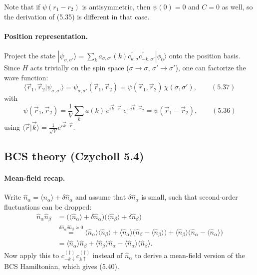 \documentclass[../../main.tex]{subfiles}
\begin{document}
Note that if $\psi(r_1-r_2)$ is antisymmetric, then $\psi(0)=0$ and $C=0$ as well, so the
derivation of (5.35) is different in that case.

\paragraph{Position representation.}
Project the state
$|\psi_{\sigma,\sigma'}\rangle=\sum_k a_{\sigma,\sigma'}(k)c^\dagger_{k,\sigma}
c^\dagger_{-k,\sigma'}|\phi_0\rangle$ onto the position basis. Since $H$ acts trivially
on the spin space ($\sigma\to\sigma$, $\sigma'\to\sigma'$), one can factorize the wave
function:
\begin{equation}
\langle \vec r_1,\vec r_2|\psi_{\sigma,\sigma'}\rangle
=\psi_{\sigma,\sigma'}(\vec r_1,\vec r_2)
=\psi(\vec r_1,\vec r_2)\,\chi(\sigma,\sigma'),
\qquad (5.37)
\end{equation}
with
\begin{equation}
\psi(\vec r_1,\vec r_2)=\frac{1}{V}\sum_k a(k)\,
e^{i\vec k\cdot\vec r_1}e^{-i\vec k\cdot\vec r_2}=\psi(\vec r_1-\vec r_2),
\qquad (5.36)
\end{equation}
using $\langle\vec r|\vec k\rangle=\frac{1}{\sqrt V}e^{i\vec k\cdot\vec r}$.

\subsection{BCS theory (Czycholl 5.4)}
\label{sec:bcs-theory_details}

\paragraph{Mean-field recap.}
Write $\hat n_\alpha=\langle n_\alpha\rangle+\delta\hat n_\alpha$ and assume that
$\delta\hat n_\alpha$ is small, such that second-order fluctuations can be dropped:
\begin{align}
\hat n_\alpha\hat n_\beta
&=\big(\langle\hat n_\alpha\rangle+\delta\hat n_\alpha\big)
  \big(\langle\hat n_\beta\rangle+\delta\hat n_\beta\big)\\
&\overset{\delta\hat n_\alpha\delta\hat n_\beta\approx0}{=}
  \langle\hat n_\alpha\rangle\langle\hat n_\beta\rangle
  +\langle\hat n_\alpha\rangle\big(\hat n_\beta-\langle\hat n_\beta\rangle\big)
  +\langle\hat n_\beta\rangle\big(\hat n_\alpha-\langle\hat n_\alpha\rangle\big)\\
&=\langle\hat n_\alpha\rangle\hat n_\beta+\langle\hat n_\beta\rangle\hat n_\alpha
  -\langle\hat n_\alpha\rangle\langle\hat n_\beta\rangle .
\end{align}
Now apply this to $c^{(\dagger)}_{-k\downarrow}c^{(\dagger)}_{k\uparrow}$ instead of
$\hat n_\alpha$ to derive a mean-field version of the BCS Hamiltonian, which gives
(5.40).
\end{document}
